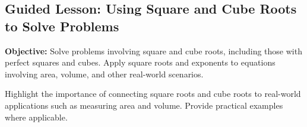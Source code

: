 \documentclass[12pt]{article}
\title{}
\date{}
\begin{document}
\subsection*{Guided Lesson: Using Square and Cube Roots to Solve Problems}
\onehalfspacing

\begin{tcolorbox}[colframe=black!40, colback=gray!5, 
coltitle=black, colbacktitle=black!20, fonttitle=\bfseries\Large, 
title=Learning Objective, halign title=center, left=5pt, right=5pt, top=5pt, bottom=15pt]
\textbf{Objective:} Solve problems involving square and cube roots, including those with perfect squares and cubes. Apply square roots and exponents to equations involving area, volume, and other real-world scenarios.

{\color{blue} Highlight the importance of connecting square roots and cube roots to real-world applications such as measuring area and volume. Provide practical examples where applicable.}
\end{tcolorbox}

\vspace{1em}
\end{document}

